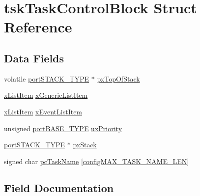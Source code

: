 \hypertarget{structtsk_task_control_block}{}\section{tsk\+Task\+Control\+Block Struct Reference}
\label{structtsk_task_control_block}
\subsection*{Data Fields}
\begin{DoxyCompactItemize}
\item 
volatile \mbox{\hyperlink{portmacro_8h_ab0a294066ac7369b8f59a52d9491a92c}{port\+S\+T\+A\+C\+K\+\_\+\+T\+Y\+PE}} $\ast$ \mbox{\hyperlink{structtsk_task_control_block_afc326fefc205c0643b866b46422dad48}{px\+Top\+Of\+Stack}}
\item 
\mbox{\hyperlink{list_8h_abc3e65a10b5c5f39142e64e69311797f}{x\+List\+Item}} \mbox{\hyperlink{structtsk_task_control_block_a95eb5853a94644043605770f63ac9a63}{x\+Generic\+List\+Item}}
\item 
\mbox{\hyperlink{list_8h_abc3e65a10b5c5f39142e64e69311797f}{x\+List\+Item}} \mbox{\hyperlink{structtsk_task_control_block_a9b0ee1554f116853c7631dc0b585ffdc}{x\+Event\+List\+Item}}
\item 
unsigned \mbox{\hyperlink{portmacro_8h_a1ebe82d24d764ae4e352f7c3a9f92c01}{port\+B\+A\+S\+E\+\_\+\+T\+Y\+PE}} \mbox{\hyperlink{structtsk_task_control_block_a82357f7be508ac5d27ae7968cddde6da}{ux\+Priority}}
\item 
\mbox{\hyperlink{portmacro_8h_ab0a294066ac7369b8f59a52d9491a92c}{port\+S\+T\+A\+C\+K\+\_\+\+T\+Y\+PE}} $\ast$ \mbox{\hyperlink{structtsk_task_control_block_a4586e39b121c224e22e0e84b04b8e3f3}{px\+Stack}}
\item 
signed char \mbox{\hyperlink{structtsk_task_control_block_a11d2c88aa454db44eb0cb0184958a7b0}{pc\+Task\+Name}} \mbox{[}\mbox{\hyperlink{_free_r_t_o_s_config_8h_ac388dc4041aab6997348828eb27fc1a8}{config\+M\+A\+X\+\_\+\+T\+A\+S\+K\+\_\+\+N\+A\+M\+E\+\_\+\+L\+EN}}\mbox{]}
\end{DoxyCompactItemize}


\subsection{Field Documentation}
\mbox{\label{structtsk_task_control_block_a11d2c88aa454db44eb0cb0184958a7b0}} 
